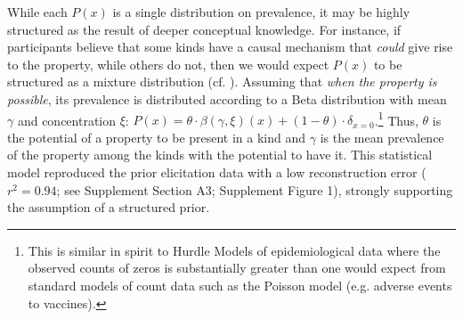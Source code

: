 \documentclass{pnastwo}
\begin{document}
\begin{article}
While each $P(x)$ is a single distribution on prevalence, it may be highly structured as the result of deeper conceptual knowledge. 
For instance, if participants believe that some kinds have a causal mechanism that \emph{could} give rise to the property, while others do not, then we would expect $P(x)$ to be structured as a mixture distribution (cf. \cite{Griffiths2005}).
Assuming that \emph{when the property is possible}, its prevalence is distributed according to a Beta distribution with mean $\gamma$ and concentration $\xi$: 
$P(x)=\theta \cdot \beta(\gamma,\xi)(x) + (1-\theta) \cdot \delta_{x=0}$.\footnote{This is similar in spirit to Hurdle Models of epidemiological data where the observed counts of zeros is substantially greater than one would expect from standard models of count data such as the Poisson model (e.g. adverse events to vaccines)\cite{hurdleModels}.}
Thus, $\theta$ is the potential of a property to be present in a kind and $\gamma$ is the mean prevalence of the property among the kinds with the potential to have it. %
This statistical model reproduced the prior elicitation data with a low reconstruction error ($r^2 = 0.94$; see Supplement Section A3; Supplement Figure 1), strongly supporting the assumption of a structured prior. 





\end{article}
\end{document}
